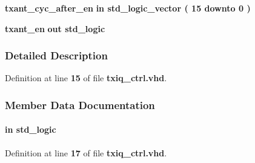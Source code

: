 \begin{DoxyCompactItemize}
\item 
{\bf txant\+\_\+cyc\+\_\+after\+\_\+en}  {\bfseries {\bfseries \textcolor{keywordflow}{in}\textcolor{vhdlchar}{ }}} {\bfseries \textcolor{comment}{std\+\_\+logic\+\_\+vector}\textcolor{vhdlchar}{ }\textcolor{vhdlchar}{(}\textcolor{vhdlchar}{ }\textcolor{vhdlchar}{ } \textcolor{vhdldigit}{15} \textcolor{vhdlchar}{ }\textcolor{keywordflow}{downto}\textcolor{vhdlchar}{ }\textcolor{vhdlchar}{ } \textcolor{vhdldigit}{0} \textcolor{vhdlchar}{ }\textcolor{vhdlchar}{)}\textcolor{vhdlchar}{ }} 
\item 
{\bf txant\+\_\+en}  {\bfseries {\bfseries \textcolor{keywordflow}{out}\textcolor{vhdlchar}{ }}} {\bfseries \textcolor{comment}{std\+\_\+logic}\textcolor{vhdlchar}{ }} 
\end{DoxyCompactItemize}


\subsubsection{Detailed Description}


Definition at line {\bf 15} of file {\bf txiq\+\_\+ctrl.\+vhd}.



\subsubsection{Member Data Documentation}
\paragraph[{clk}]{ {\bfseries \textcolor{keywordflow}{in}\textcolor{vhdlchar}{ }} {\bfseries \textcolor{comment}{std\+\_\+logic}\textcolor{vhdlchar}{ }} \hspace{0.3cm}{\ttfamily [Port]}}\label{classtxiq__ctrl_a4a4609c199d30b3adebbeb3a01276ec5}


Definition at line {\bf 17} of file {\bf txiq\+\_\+ctrl.\+vhd}.

\paragraph[{ieee}]{\hspace{0.3cm}{\ttfamily [Library]}}\label{classtxiq__ctrl_a0a6af6eef40212dbaf130d57ce711256}


